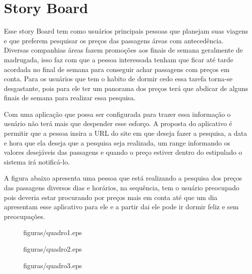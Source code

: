 \chapter[Story Board]{Story Board}

Esse story Board tem como  usuários principais pessoas que planejam suas viagens e que preferem pesquisar os preços das passagens áreas com antecedência. Diversas companhias áreas fazem promoções aos finais de semana geralmente de madrugada, isso faz com que a pessoa interessada tenham que ficar até tarde acordada no final de semana para conseguir achar passagens com preços em conta. Para os usuários que tem o habito de dormir cedo essa tarefa torna-se desgastante, pois para ele ter um panorama dos preços terá que abdicar de alguns finais de semana para realizar essa pesquisa. 

Com uma aplicação que possa ser configurada para trazer essa informação o usuário não terá mais que  despender esse esforço. A proposta do aplicativo é permitir que a pessoa insira a URL do site em que deseja fazer a pesquisa, a data e hora que ela deseja que a pesquisa seja realizada, um range informando os valores desejáveis das passagens e quando o preço estiver dentro do estipulado o sistema irá notificá-lo. 

A figura abaixo apresenta uma pessoa que está realizando a pesquisa dos preços das passagens diversos  dias e horários, na sequência, tem o usuário preocupado pois deveria estar procurando por preços mais em conta até que um dia apresentam esse aplicativo para ele e a partir dai ele pode ir dormir feliz e sem preocupações.


\begin{figure}[h]
	\centering
	\label{fig01}{figuras/quadro1.eps}
	\caption{}
\end{figure}

\begin{figure}[h]
	\centering
	\label{fig01}{figuras/quadro2.eps}
\end{figure}

\begin{figure}[h]
	\centering
	\label{fig01}{figuras/quadro3.eps}
\end{figure}

